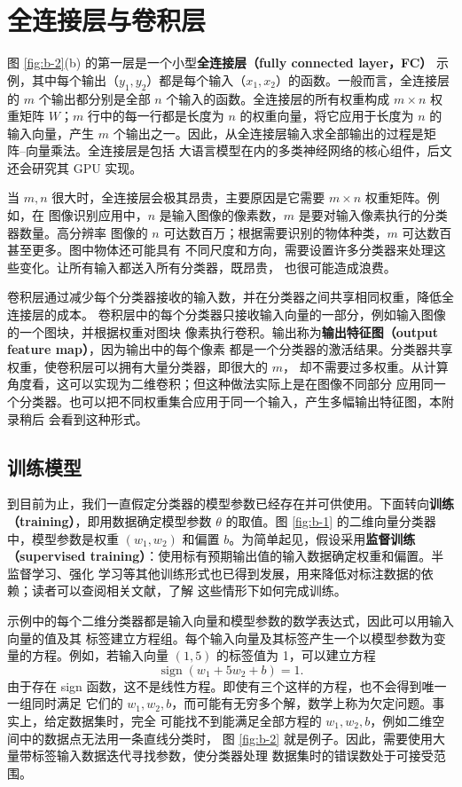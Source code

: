 \section{全连接层与卷积层}
\label{sec:appb-fc-conv}

图 \ref{fig:b-2}(b) 的第一层是一个小型\textbf{全连接层（fully connected layer，FC）}
示例，其中每个输出（$y_1,y_2$）都是每个输入（$x_1,x_2$）的函数。一般而言，全连接层的
$m$ 个输出都分别是全部 $n$ 个输入的函数。全连接层的所有权重构成 $m\times n$ 权重矩阵
$W$；$m$ 行中的每一行都是长度为 $n$ 的权重向量，将它应用于长度为 $n$ 的输入向量，产生
$m$ 个输出之一。因此，从全连接层输入求全部输出的过程是矩阵--向量乘法。全连接层是包括
大语言模型在内的多类神经网络的核心组件，后文还会研究其 GPU 实现。

当 $m,n$ 很大时，全连接层会极其昂贵，主要原因是它需要 $m\times n$ 权重矩阵。例如，在
图像识别应用中，$n$ 是输入图像的像素数，$m$ 是要对输入像素执行的分类器数量。高分辨率
图像的 $n$ 可达数百万；根据需要识别的物体种类，$m$ 可达数百甚至更多。图中物体还可能具有
不同尺度和方向，需要设置许多分类器来处理这些变化。让所有输入都送入所有分类器，既昂贵，
也很可能造成浪费。

卷积层通过减少每个分类器接收的输入数，并在分类器之间共享相同权重，降低全连接层的成本。
卷积层中的每个分类器只接收输入向量的一部分，例如输入图像的一个图块，并根据权重对图块
像素执行卷积。输出称为\textbf{输出特征图（output feature map）}，因为输出中的每个像素
都是一个分类器的激活结果。分类器共享权重，使卷积层可以拥有大量分类器，即很大的 $m$，
却不需要过多权重。从计算角度看，这可以实现为二维卷积；但这种做法实际上是在图像不同部分
应用同一个分类器。也可以把不同权重集合应用于同一个输入，产生多幅输出特征图，本附录稍后
会看到这种形式。

\subsection{训练模型}
\label{sec:appb-training-models}

到目前为止，我们一直假定分类器的模型参数已经存在并可供使用。下面转向\textbf{训练
（training）}，即用数据确定模型参数 $\theta$ 的取值。图 \ref{fig:b-1} 的二维向量分类器
中，模型参数是权重 $(w_1,w_2)$ 和偏置 $b$。为简单起见，假设采用\textbf{监督训练
（supervised training）}：使用标有预期输出值的输入数据确定权重和偏置。半监督学习、强化
学习等其他训练形式也已得到发展，用来降低对标注数据的依赖；读者可以查阅相关文献，了解
这些情形下如何完成训练。

示例中的每个二维分类器都是输入向量和模型参数的数学表达式，因此可以用输入向量的值及其
标签建立方程组。每个输入向量及其标签产生一个以模型参数为变量的方程。例如，若输入向量
$(1,5)$ 的标签值为 1，可以建立方程
\begin{equation}
  \operatorname{sign}(w_1+5w_2+b)=1.
  \label{eq:appb-5}
\end{equation}
由于存在 sign 函数，这不是线性方程。即使有三个这样的方程，也不会得到唯一一组同时满足
它们的 $w_1,w_2,b$，而可能有无穷多个解，数学上称为欠定问题。事实上，给定数据集时，完全
可能找不到能满足全部方程的 $w_1,w_2,b$，例如二维空间中的数据点无法用一条直线分类时，
图 \ref{fig:b-2} 就是例子。因此，需要使用大量带标签输入数据迭代寻找参数，使分类器处理
数据集时的错误数处于可接受范围。

